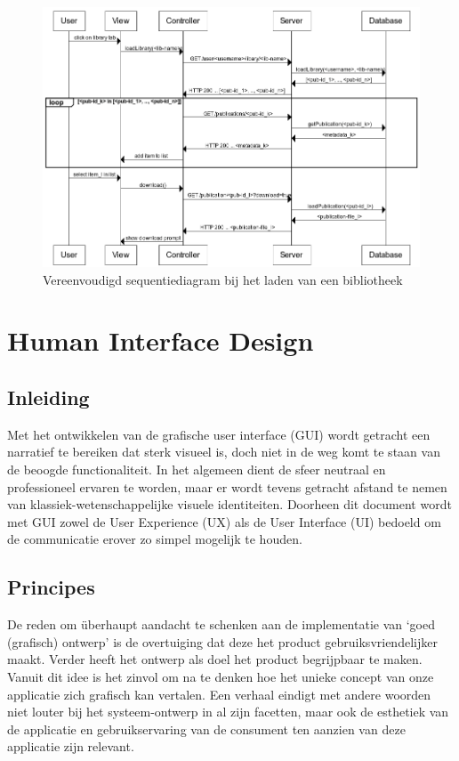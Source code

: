 \documentclass{article}
\begin{document}
\begin{figure}[!h]
\centering
 \includegraphics[width=145mm]{library-sequence.png}
 \caption{Vereenvoudigd sequentiediagram bij het laden van een bibliotheek}
 \label{library-sequence}
\end{figure}


\clearpage

\section{Human Interface Design}

\subsection{Inleiding}

Met het ontwikkelen van de grafische user interface (GUI) wordt getracht een narratief te bereiken dat sterk visueel is, doch niet in de weg komt te staan van de beoogde functionaliteit. In het algemeen dient de sfeer neutraal en professioneel ervaren te worden, maar er wordt tevens getracht afstand te nemen van klassiek-wetenschappelijke visuele identiteiten. Doorheen dit document wordt met GUI zowel de User Experience (UX) als de User Interface (UI) bedoeld om de communicatie erover zo simpel mogelijk te houden.


\subsection{Principes}

De reden om überhaupt aandacht te schenken aan de implementatie van `goed (grafisch) ontwerp' is de overtuiging dat deze het product gebruiksvriendelijker maakt. Verder heeft het ontwerp als doel het product begrijpbaar te maken. Vanuit dit idee is het zinvol om na te denken hoe het unieke concept van onze applicatie zich grafisch kan vertalen. Een verhaal eindigt met andere woorden niet louter bij het systeem-ontwerp in al zijn facetten, maar ook de esthetiek van de applicatie en gebruikservaring van de consument ten aanzien van deze applicatie zijn relevant. %
\\
\end{document}
